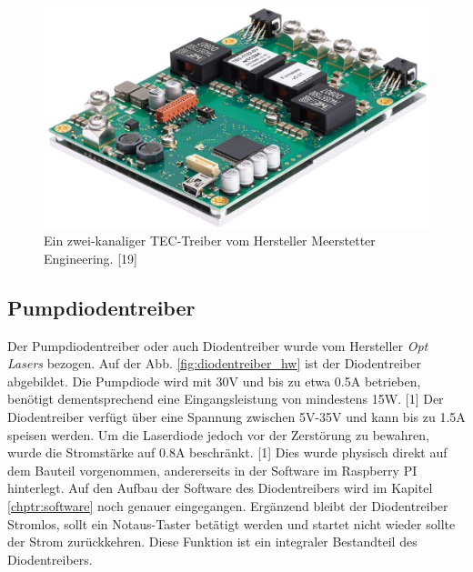 \begin{figure}[H]
    \centering
    \includegraphics[scale=0.2]{98_images/tec_controller_real_isometry_meerstetter.PNG}
    \caption{Ein zwei-kanaliger TEC-Treiber vom Hersteller Meerstetter Engineering. [19]}
    \label{fig:tec_treiber_hw}
\end{figure}

\subsection{Pumpdiodentreiber}
\label{chptr:_diodentreiber}
Der Pumpdiodentreiber oder auch Diodentreiber wurde vom Hersteller \textit{Opt Lasers} bezogen. Auf der Abb. \ref{fig:diodentreiber_hw} ist der Diodentreiber abgebildet. Die Pumpdiode wird mit 30V und bis zu etwa 0.5A betrieben, benötigt dementsprechend eine Eingangsleistung von mindestens 15W. [1] Der Diodentreiber verfügt über eine Spannung zwischen 5V-35V und kann bis zu 1.5A speisen werden. Um die Laserdiode jedoch vor der Zerstörung zu bewahren, wurde die Stromstärke auf 0.8A beschränkt. [1] Dies wurde physisch direkt auf dem Bauteil vorgenommen, andererseits in der Software im Raspberry PI hinterlegt. Auf den Aufbau der Software des Diodentreibers wird im Kapitel \ref{chptr:software} noch genauer eingegangen. Ergänzend bleibt der Diodentreiber Stromlos, sollt ein Notaus-Taster betätigt werden und startet nicht wieder sollte der Strom zurückkehren. Diese Funktion ist ein integraler Bestandteil des Diodentreibers.

